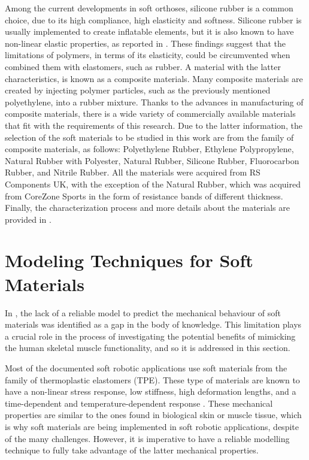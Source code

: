 Among the current developments in soft orthoses, silicone rubber is a common choice, due to its high compliance, high elasticity and softness. Silicone rubber is usually implemented to create inflatable elements, but it is also known to have non-linear elastic properties, as reported in \cite{roylance2008mechanical}. These findings suggest that the limitations of polymers, in terms of its elasticity, could be circumvented when combined them with elastomers, such as rubber. A material with the latter characteristics, is known as a composite materials. Many composite materials are created by injecting polymer particles, such as the previously mentioned polyethylene, into a rubber mixture. Thanks to the advances in manufacturing of composite materials, there is a wide variety of commercially available materials that fit with the requirements of this research. Due to the latter information, the selection of the soft materials to be studied in this work are from the family of composite materials, as follows: Polyethylene Rubber, Ethylene Polypropylene, Natural Rubber with Polyester, Natural Rubber, Silicone Rubber, Fluorocarbon Rubber, and Nitrile Rubber. All the materials were acquired from RS Components UK\textregistered{}, with the exception of the Natural Rubber, which was acquired from CoreZone Sports\textregistered{} in the form of resistance bands of different thickness. Finally, the characterization process and more details about the materials are provided in .

\newpage

\section{Modeling Techniques for Soft Materials}

In , the lack of a reliable model to predict the mechanical behaviour of soft materials was identified as a gap in the body of knowledge. This limitation plays a crucial role in the process of investigating the potential benefits of mimicking the human skeletal muscle functionality, and so it is addressed in this section. 

Most of the documented soft robotic applications use soft materials from the family of thermoplastic elastomers (TPE). These type of materials are known to have a non-linear stress response, low stiffness, high deformation lengths, and a time-dependent and temperature-dependent response \cite{Bauman2008}. These mechanical properties are similar to the ones found in biological skin or muscle tissue, which is why soft materials are being implemented in soft robotic applications, despite of the many challenges. However, it is imperative to have a reliable modelling technique to fully take advantage of the latter mechanical properties.

